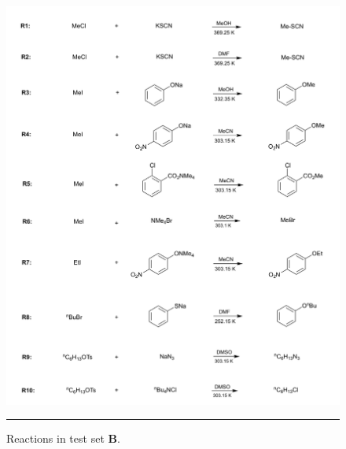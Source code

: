 \documentclass[../main.tex]{subfiles}
\begin{document}
\begin{figure}[h!]
	\centering
	\includegraphics[width=14.5cm]{8/figs/vlasov_sn2}
	\vspace{0.2cm}
	\hrule
	\caption{Reactions in test set {\bfseries{B}}.}
	\label{vlasov_sn2}
\end{figure}


\clearpage
\end{document}
